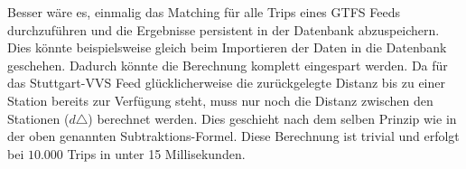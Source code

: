     Besser wäre es, einmalig das Matching für alle Trips eines GTFS Feeds durchzuführen und die Ergebnisse persistent in der Datenbank abzuspeichern. Dies könnte beispielsweise gleich beim Importieren der Daten in die Datenbank geschehen. Dadurch könnte die Berechnung komplett eingespart werden. 
    Da für das Stuttgart-VVS Feed glücklicherweise die zurückgelegte Distanz bis zu einer Station bereits zur Verfügung steht, muss nur noch die Distanz zwischen den Stationen ($d\triangle$) berechnet werden. Dies geschieht nach dem selben Prinzip wie in der oben genannten Subtraktions-Formel. Diese Berechnung ist trivial und erfolgt bei $10.000$ Trips in unter 15 Millisekunden.

